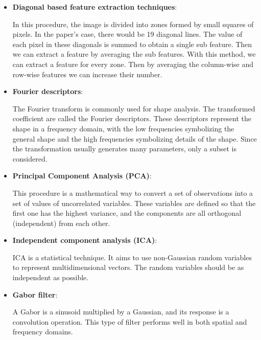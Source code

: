 \documentclass[conference]{IEEEtran}
\begin{document}
					\begin{itemize}
					
						\item \textbf{Diagonal based feature extraction techniques}:
						
							In this procedure, the image is divided into zones formed by small squares of pixels. 
							In the paper's case, there would be 19 diagonal lines. 
							The value of each pixel in these diagonals is summed to obtain a single sub feature. 
							Then we can extract a feature by averaging the sub features. 
							With this method, we can extract a feature for every zone. 
							Then by averaging the column-wise and row-wise features we can increase their number. 
							
						
						\item \textbf{Fourier descriptors}:
						
							The Fourier transform is commonly used for shape analysis. 
							The transformed coefficient are called the Fourier descriptors.
							These descriptors represent the shape in a frequency domain, with the low frequencies symbolizing the general shape and the high frequencies symbolizing details of the shape. 
							Since the transformation usually generates many parameters, only a subset is considered.
						
						
						\item \textbf{Principal Component Analysis (PCA)}:
						
							This procedure is a mathematical way to convert a set of observations into a set of values of uncorrelated variables. 
							These variables are defined so that the first one has the highest variance, and the components are all orthogonal (independent) from each other. 
							
						\item \textbf{Independent component analysis (ICA)}:
						
							ICA is a statistical technique. 
							It aims to use non-Gaussian random variables to represent multidimensional vectors. 
							The random variables should be as independent as possible. 
						
						\item \textbf{Gabor filter}:
						
							A Gabor is a sinusoid multiplied by a Gaussian, and its response is a convolution operation. 
							This type of filter performs well in both spatial and frequency domains. 
						

\end{itemize}
\end{document}
